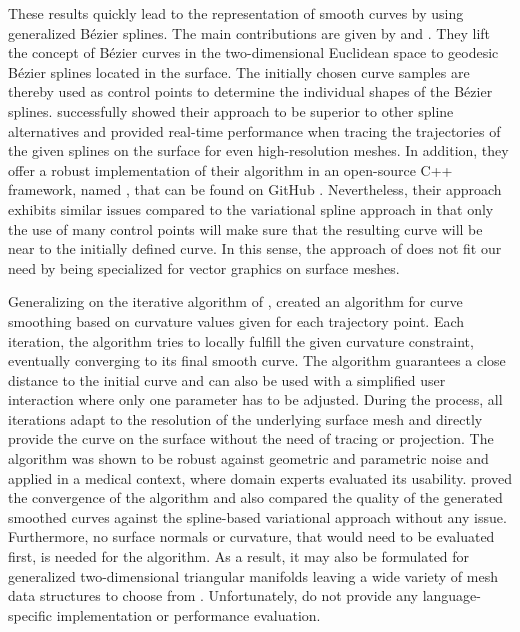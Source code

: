 \documentclass{stdlocal}
\begin{document}
These results quickly lead to the representation of smooth curves by using generalized Bézier splines.
The main contributions are given by \textcite{martinez2007} and \textcite{mancinelli2022}.
They lift the concept of Bézier curves in the two-dimensional Euclidean space to geodesic Bézier splines located in the surface.
The initially chosen curve samples are thereby used as control points to determine the individual shapes of the Bézier splines.
\textcite{mancinelli2022} successfully showed their approach to be superior to other spline alternatives and provided real-time performance when tracing the trajectories of the given splines on the surface for even high-resolution meshes.
In addition, they offer a robust implementation of their algorithm in an open-source C++ framework, named  \autocite{agus2019}, that can be found on GitHub .
Nevertheless, their approach exhibits similar issues compared to the variational spline approach in that only the use of many control points will make sure that the resulting curve will be near to the initially defined curve.
In this sense, the approach of \textcite{mancinelli2022} does not fit our need by being specialized for vector graphics on surface meshes.

Generalizing on the iterative algorithm of \textcite{martinez2005}, \textcite{lawonn2014} created an algorithm for curve smoothing based on curvature values given for each trajectory point.
Each iteration, the algorithm tries to locally fulfill the given curvature constraint, eventually converging to its final smooth curve.
The algorithm guarantees a close distance to the initial curve and can also be used with a simplified user interaction where only one parameter has to be adjusted.
During the process, all iterations adapt to the resolution of the underlying surface mesh and directly provide the curve on the surface without the need of tracing or projection.
The algorithm was shown to be robust against geometric and parametric noise and applied in a medical context, where domain experts evaluated its usability.
\textcite{lawonn2014} proved the convergence of the algorithm and also compared the quality of the generated smoothed curves against the spline-based variational approach without any issue.
Furthermore, no surface normals or curvature, that would need to be evaluated first, is needed for the algorithm.
As a result, it may also be formulated for generalized two-dimensional triangular manifolds leaving a wide variety of mesh data structures to choose from \autocite{guibas1985}.
Unfortunately, \textcite{lawonn2014} do not provide any language-specific implementation or performance evaluation.
\end{document}
